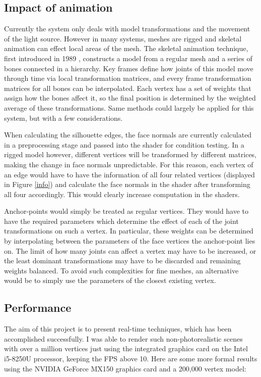 \documentclass[a4paper,10pt]{article}
\begin{document}
\subsection{Impact of animation}
Currently the system only deals with model transformations and the movement of the light source. However in many systems, meshes are rigged and skeletal animation can effect local areas of the mesh. The skeletal animation technique, first introduced in 1989 \cite{Thalmann1989}, constructs a model from a regular mesh and a series of bones connected in a hierarchy. Key frames define how joints of this model move through time via local transformation matrices, and every frame transformation matrices for all bones can be interpolated. Each vertex has a set of weights that assign how the bones affect it, so the final position is determined by the weighted average of these transformations. Same methods could largely be applied for this system, but with a few considerations.

When calculating the silhouette edges, the face normals are currently calculated in a preprocessing stage and passed into the shader for condition testing. In a rigged model however, different vertices will be transformed by different matrices, making the change in face normals unpredictable. For this reason, each vertex of an edge would have to have the information of all four related vertices (displayed in Figure \ref{info}) and calculate the face normals in the shader after transforming all four accordingly. This would clearly increase computation in the shaders.

Anchor-points would simply be treated as regular vertices. They would have to have the required parameters which determine the effect of each of the joint transformations on such a vertex. In particular, these weights can be determined by interpolating between the parameters of the face vertices the anchor-point lies on. The limit of how many joints can affect a vertex may have to be increased, or the least dominant transformations may have to be discarded and remaining weights balanced. To avoid such complexities for fine meshes, an alternative would be to simply use the parameters of the closest existing vertex.

\subsection{Performance}
The aim of this project is to present real-time techniques, which has been accomplished successfully. I was able to render such non-photorealistic scenes with over a million vertices just using the integrated graphics card on the Intel i5-8250U processor, keeping the FPS above 10. Here are some more formal results using the NVIDIA GeForce MX150 graphics card and a 200,000 vertex model:
\end{document}
